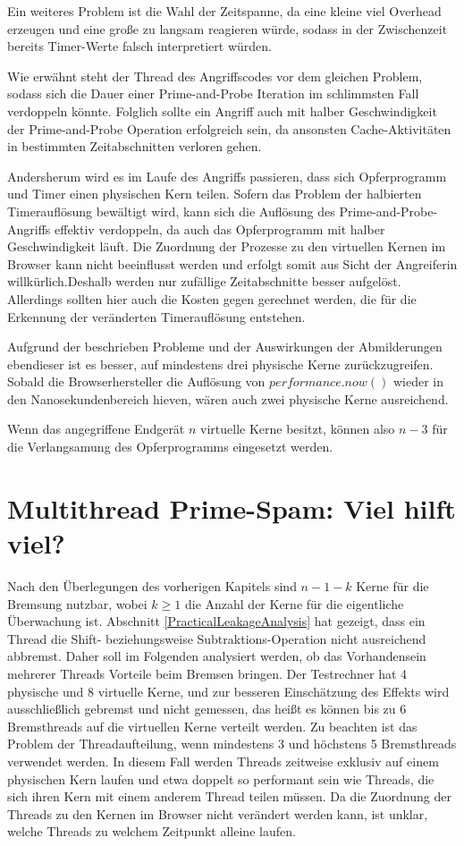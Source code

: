 Ein weiteres Problem ist die Wahl der Zeitspanne, da eine kleine viel Overhead erzeugen und eine große zu langsam reagieren würde, sodass in der Zwischenzeit bereits Timer-Werte falsch interpretiert würden.

Wie erwähnt steht der Thread des Angriffscodes vor dem gleichen Problem, sodass sich die Dauer einer Prime-and-Probe Iteration im schlimmsten Fall verdoppeln könnte.
Folglich sollte ein Angriff auch mit halber Geschwindigkeit der Prime-and-Probe Operation erfolgreich sein, da ansonsten Cache-Aktivitäten in bestimmten Zeitabschnitten verloren gehen.

Andersherum wird es im Laufe des Angriffs passieren, dass sich Opferprogramm und Timer einen physischen Kern teilen.
Sofern das Problem der halbierten Timerauflösung bewältigt wird, kann sich die Auflösung des Prime-and-Probe-Angriffs effektiv verdoppeln, da auch das Opferprogramm mit halber Geschwindigkeit läuft.
Die Zuordnung der Prozesse zu den virtuellen Kernen im Browser kann nicht beeinflusst werden und erfolgt somit aus Sicht der Angreiferin willkürlich.Deshalb werden nur zufällige Zeitabschnitte besser aufgelöst.
Allerdings sollten hier auch die Kosten gegen gerechnet werden, die für die Erkennung der veränderten Timerauflösung entstehen.

Aufgrund der beschrieben Probleme und der Auswirkungen der Abmilderungen ebendieser ist es besser, auf mindestens drei physische Kerne zurückzugreifen.
Sobald die Browserhersteller die Auflösung von $performance.now()$ wieder in den Nanosekundenbereich hieven, wären auch zwei physische Kerne ausreichend. 

Wenn das angegriffene Endgerät $n$ virtuelle Kerne besitzt, können also $n-3$ für die Verlangsamung des Opferprogramms eingesetzt werden.

\section{Multithread Prime-Spam: Viel hilft viel?}
\label{MoreIsBetter}

Nach den Überlegungen des vorherigen Kapitels sind $n-1-k$ Kerne für die Bremsung nutzbar, wobei $k \geq 1$ die Anzahl der Kerne für die eigentliche Überwachung ist. 
Abschnitt \ref{PracticalLeakageAnalysis} hat gezeigt, dass ein Thread die Shift- beziehungsweise Subtraktions-Operation nicht ausreichend abbremst.
Daher soll im Folgenden analysiert werden, ob das Vorhandensein mehrerer Threads Vorteile beim Bremsen bringen.
Der Testrechner hat 4 physische und 8 virtuelle Kerne, und zur besseren Einschätzung des Effekts wird ausschließlich gebremst und nicht gemessen, das heißt es können bis zu 6 Bremsthreads auf die virtuellen Kerne verteilt werden.
Zu beachten ist das Problem der Threadaufteilung, wenn mindestens 3 und höchstens 5 Bremsthreads verwendet werden.
In diesem Fall werden Threads zeitweise exklusiv auf einem physischen Kern laufen und etwa doppelt so performant sein wie Threads, die sich ihren Kern mit einem anderem Thread teilen müssen.
Da die Zuordnung der Threads zu den Kernen im Browser nicht verändert werden kann, ist unklar, welche Threads zu welchem Zeitpunkt alleine laufen.

